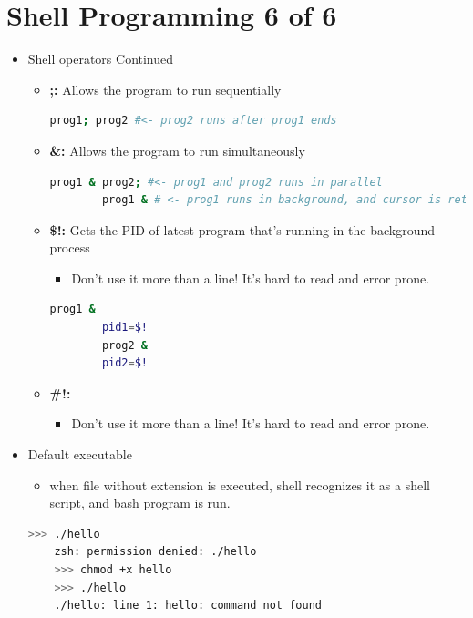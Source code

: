 \documentclass[12pt]{article}
\begin{document}
\bigskip

\section*{Shell Programming 6 of 6}

\bigskip

\begin{itemize}
    \item Shell operators Continued
    \begin{itemize}
        \item \textbf{;:} Allows the program to run sequentially
        \begin{lstlisting}[language=bash]
        prog1; prog2 #<- prog2 runs after prog1 ends
        \end{lstlisting}

        \item \textbf{\&:} Allows the program to run simultaneously

        \begin{lstlisting}[language=bash]
        prog1 & prog2; #<- prog1 and prog2 runs in parallel
        prog1 & # <- prog1 runs in background, and cursor is returned immediately
        \end{lstlisting}

        \item \textbf{\$!:} Gets the PID of latest program that's running in the background process
        \begin{itemize}
            \item Don't use it more than a line! It's hard to read and error prone.
        \end{itemize}

        \begin{lstlisting}[language=bash]
        prog1 &
        pid1=$!
        prog2 &
        pid2=$!
        \end{lstlisting}

        \item \textbf{\#!:}
        \begin{itemize}
            \item Don't use it more than a line! It's hard to read and error prone.
        \end{itemize}
    \end{itemize}

    \item Default executable
    \begin{itemize}
        \item when file without extension is executed, shell recognizes it as
        a shell script, and bash program is run.
    \end{itemize}

    \begin{lstlisting}[language=bash]
    >>> ./hello
    zsh: permission denied: ./hello
    >>> chmod +x hello
    >>> ./hello
    ./hello: line 1: hello: command not found
    \end{lstlisting}
\end{itemize}
\end{document}
